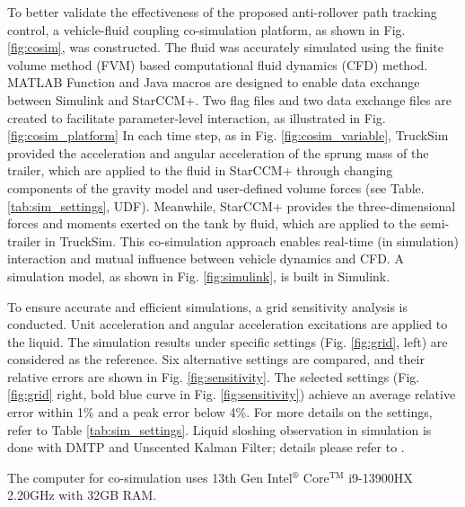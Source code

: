 To better validate the effectiveness of the proposed anti-rollover path tracking control, a vehicle-fluid coupling co-simulation platform, as shown in Fig. \ref{fig:cosim}, was constructed. The fluid was accurately simulated using the finite volume method (FVM) based computational fluid dynamics (CFD) method. MATLAB Function and Java macros are designed to enable data exchange between Simulink and StarCCM+. Two flag files and two data exchange files are created to facilitate parameter-level interaction, as illustrated in Fig. \ref{fig:cosim_platform} In each time step, as in Fig. \ref{fig:cosim_variable}, TruckSim provided the acceleration and angular acceleration of the sprung mass of the trailer, which are applied to the fluid in StarCCM+ through changing components of the gravity model and user-defined volume forces (see Table.\ref{tab:sim_settings}, UDF). Meanwhile, StarCCM+ provides the three-dimensional forces and moments exerted on the tank by fluid, which are applied to the semi-trailer in TruckSim. This co-simulation approach enables real-time (in simulation) interaction and mutual influence between vehicle dynamics and CFD. A simulation model, as shown in Fig. \ref{fig:simulink}, is built in Simulink.

To ensure accurate and efficient simulations, a grid sensitivity analysis is conducted. Unit acceleration and angular acceleration excitations are applied to the liquid. The simulation results under specific settings (Fig. \ref{fig:grid}, left) are considered as the reference. Six alternative settings are compared, and their relative errors are shown in Fig. \ref{fig:sensitivity}. The selected settings (Fig. \ref{fig:grid} right, bold blue curve in Fig. \ref{fig:sensitivity}) achieve an average relative error within 1\% and a peak error below 4\%. For more details on the settings, refer to Table \ref{tab:sim_settings}. Liquid sloshing observation in simulation is done with DMTP and Unscented Kalman Filter; details please refer to \cite{KomasaMutiDOF}.

The computer for co-simulation uses 13th Gen Intel$^\circledR$ Core$^{\text{TM}}$  i9-13900HX 2.20GHz with 32GB RAM.

